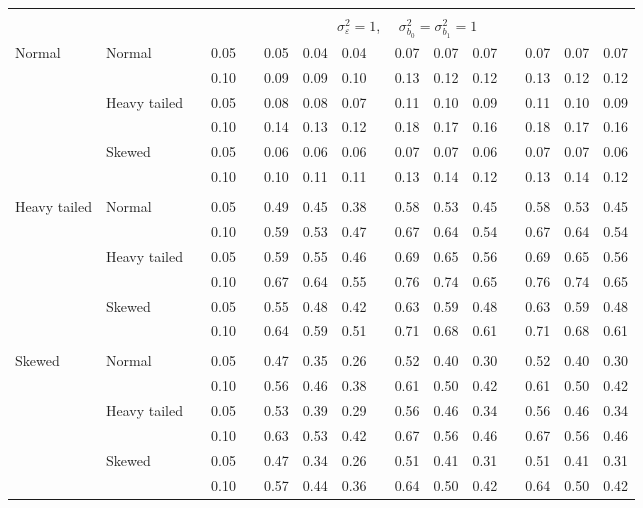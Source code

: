 \documentclass{article} %
\begin{document}
\begin{table}[ht]
\begin{scriptsize}
\begin{center}
\begin{tabular}{ll p{.1cm} c p{.1cm} rrr p{.1cm} rrr p{.1cm} rrr}
&&&&&&&&&&&&&&&\\
& && && \multicolumn{9}{c}{$\sigma_{\varepsilon}^2 = 1$, \ \ $\sigma_{b_0}^2 = \sigma_{b_1}^2 = 1$} \\ \cline{6-16}
\rowcolor{gray!20}Normal       & Normal       && 0.05 &&   0.05 & 0.04 & 0.04 && 0.07 & 0.07 & 0.07 && 0.07 & 0.07 & 0.07 \\ 
\rowcolor{gray!20}             &              && 0.10 &&   0.09 & 0.09 & 0.10 && 0.13 & 0.12 & 0.12 && 0.13 & 0.12 & 0.12 \\ 
\rowcolor{gray!20}             & Heavy tailed && 0.05 &&   0.08 & 0.08 & 0.07 && 0.11 & 0.10 & 0.09 && 0.11 & 0.10 & 0.09 \\ 
\rowcolor{gray!20}             &              && 0.10 &&   0.14 & 0.13 & 0.12 && 0.18 & 0.17 & 0.16 && 0.18 & 0.17 & 0.16 \\ 
\rowcolor{gray!20}             & Skewed       && 0.05 &&   0.06 & 0.06 & 0.06 && 0.07 & 0.07 & 0.06 && 0.07 & 0.07 & 0.06 \\ 
\rowcolor{gray!20}             &              && 0.10 &&   0.10 & 0.11 & 0.11 && 0.13 & 0.14 & 0.12 && 0.13 & 0.14 & 0.12 \\ 
             &&&&&&&&&&&&&&&\\
Heavy tailed & Normal       && 0.05 &&   0.49 & 0.45 & 0.38 && 0.58 & 0.53 & 0.45 && 0.58 & 0.53 & 0.45 \\ 
             &              && 0.10 &&   0.59 & 0.53 & 0.47 && 0.67 & 0.64 & 0.54 && 0.67 & 0.64 & 0.54 \\ 
             & Heavy tailed && 0.05 &&   0.59 & 0.55 & 0.46 && 0.69 & 0.65 & 0.56 && 0.69 & 0.65 & 0.56 \\ 
             &              && 0.10 &&   0.67 & 0.64 & 0.55 && 0.76 & 0.74 & 0.65 && 0.76 & 0.74 & 0.65 \\ 
             & Skewed       && 0.05 &&   0.55 & 0.48 & 0.42 && 0.63 & 0.59 & 0.48 && 0.63 & 0.59 & 0.48 \\ 
             &              && 0.10 &&   0.64 & 0.59 & 0.51 && 0.71 & 0.68 & 0.61 && 0.71 & 0.68 & 0.61 \\ 
             &&&&&&&&&&&&&&&\\
Skewed       & Normal       && 0.05 &&   0.47 & 0.35 & 0.26 && 0.52 & 0.40 & 0.30 && 0.52 & 0.40 & 0.30 \\ 
             &              && 0.10 &&   0.56 & 0.46 & 0.38 && 0.61 & 0.50 & 0.42 && 0.61 & 0.50 & 0.42 \\ 
             & Heavy tailed && 0.05 &&   0.53 & 0.39 & 0.29 && 0.56 & 0.46 & 0.34 && 0.56 & 0.46 & 0.34 \\ 
             &              && 0.10 &&   0.63 & 0.53 & 0.42 && 0.67 & 0.56 & 0.46 && 0.67 & 0.56 & 0.46 \\ 
             & Skewed       && 0.05 &&   0.47 & 0.34 & 0.26 && 0.51 & 0.41 & 0.31 && 0.51 & 0.41 & 0.31 \\ 
             &              && 0.10 &&   0.57 & 0.44 & 0.36 && 0.64 & 0.50 & 0.42 && 0.64 & 0.50 & 0.42 \\ 



\end{tabular}
\end{center}
\end{scriptsize}
\end{table}
\end{document}
